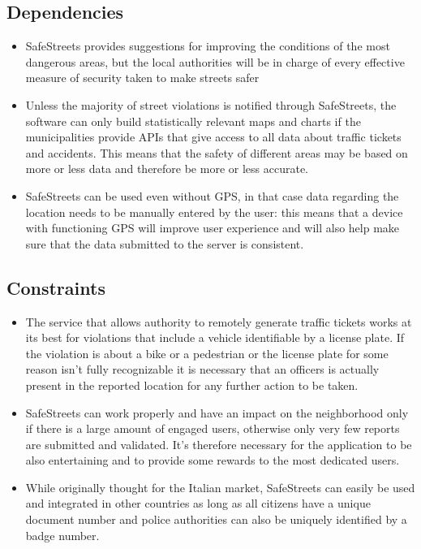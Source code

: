 \subsection{Dependencies}
  \begin{itemize}
    \item SafeStreets provides suggestions for improving the conditions of the most dangerous areas, but the local authorities will be in charge of every effective measure of security taken to make streets safer
    \item Unless the majority of street violations is notified through SafeStreets, the software can only build statistically relevant maps and charts if the municipalities provide APIs that give access to all data about traffic tickets and accidents. This means that the safety of different areas may be based on more or less data and therefore be more or less accurate.
    \item SafeStreets can be used even without GPS, in that case data regarding the location needs to be manually entered by the user: this means that a device with functioning GPS will improve user experience and will also help make sure that the data submitted to the server is consistent.
  \end{itemize}

\subsection{Constraints}
  \begin{itemize}
    \item The service that allows authority to remotely generate traffic tickets works at its best for violations that include a vehicle identifiable by a license plate. If the violation is about a bike or a pedestrian or the license plate for some reason isn't fully recognizable it is necessary that an officers is actually present in the reported location for any further action to be taken.
    \item SafeStreets can work properly and have an impact on the neighborhood only if there is a large amount of engaged users, otherwise only very few reports are submitted and validated. It's therefore necessary for the application to be also entertaining and to provide some rewards to the most dedicated users.
    \item While originally thought for the Italian market, SafeStreets can easily be used and integrated in other countries as long as all citizens have a unique document number and police authorities can also be uniquely identified by a badge number. 
  \end{itemize}
